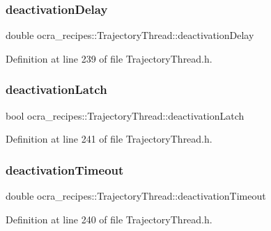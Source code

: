 \subsubsection{\texorpdfstring{deactivation\+Delay}{deactivationDelay}}
{\footnotesize\ttfamily double ocra\+\_\+recipes\+::\+Trajectory\+Thread\+::deactivation\+Delay\hspace{0.3cm}{\ttfamily [protected]}}



Definition at line 239 of file Trajectory\+Thread.\+h.

\hypertarget{classocra__recipes_1_1TrajectoryThread_a5bdb397e0f051c99e563074946e01a82}{}\label{classocra__recipes_1_1TrajectoryThread_a5bdb397e0f051c99e563074946e01a82} 
\subsubsection{\texorpdfstring{deactivation\+Latch}{deactivationLatch}}
{\footnotesize\ttfamily bool ocra\+\_\+recipes\+::\+Trajectory\+Thread\+::deactivation\+Latch\hspace{0.3cm}{\ttfamily [protected]}}



Definition at line 241 of file Trajectory\+Thread.\+h.

\hypertarget{classocra__recipes_1_1TrajectoryThread_ab4de56a2b92a1887e4d046d7fa70d721}{}\label{classocra__recipes_1_1TrajectoryThread_ab4de56a2b92a1887e4d046d7fa70d721} 
\subsubsection{\texorpdfstring{deactivation\+Timeout}{deactivationTimeout}}
{\footnotesize\ttfamily double ocra\+\_\+recipes\+::\+Trajectory\+Thread\+::deactivation\+Timeout\hspace{0.3cm}{\ttfamily [protected]}}



Definition at line 240 of file Trajectory\+Thread.\+h.

